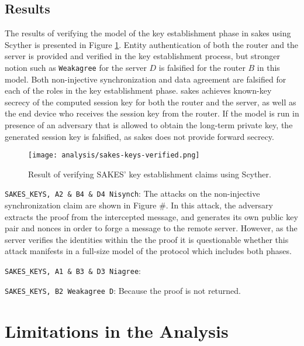 \subsection{Results}

The results of verifying the model of the key establishment phase in \gls{sakes} using Scyther is presented in Figure \ref{fig:sakes-verified-keys}. Entity authentication of both the router and the server is provided and verified in the key establishment process, but stronger notion such as \texttt{Weakagree} for the server $D$ is falsified for the router $B$ in this model. Both non-injective synchronization and data agreement are falsified for each of the roles in the key establishment phase. \gls{sakes} achieves known-key secrecy of the computed session key for both the router and the server, as well as the end device who receives the session key from the router.  If the model is run in presence of an adversary that is allowed to obtain the long-term private key, the generated session key is falsified, as \gls{sakes} does not provide forward secrecy.

\begin{figure}[h]
	\centering
	\texttt{[image: analysis/sakes-keys-verified.png]}
	\caption{Result of verifying SAKES' key establishment claims using Scyther.}
	\label{fig:sakes-verified-keys}
\end{figure}

\begin{list}{•}{}

\item \texttt{SAKES\_KEYS, A2 \& B4 \& D4 Nisynch}: The attacks on the non-injective synchronization claim are shown in Figure \#. In this attack, the adversary extracts the proof from the intercepted message, and generates its own public key pair and nonces in order to 	forge a message to the remote server. However, as the server verifies the identities within the the proof it is questionable whether this attack manifests in a full-size model of the protocol which includes both phases.

\item \texttt{SAKES\_KEYS, A1 \& B3 \& D3 Niagree}:

\item \texttt{SAKES\_KEYS, B2 Weakagree D}: Because the proof is not returned.
\end{list}


\section{Limitations in the Analysis}

